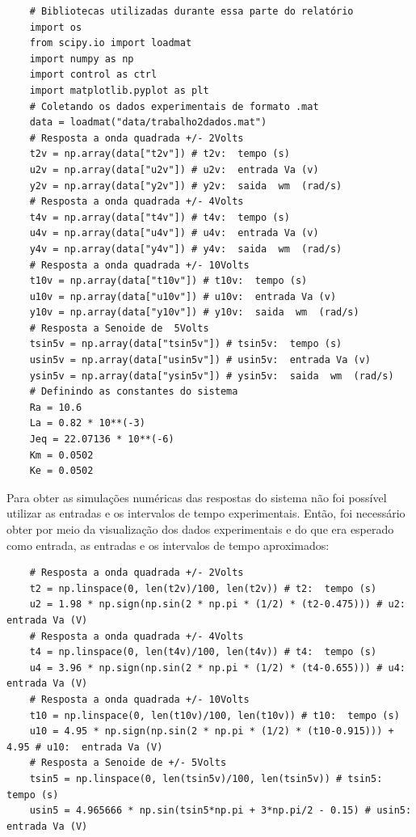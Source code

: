 \documentclass[10pt]{article}
\begin{document}
\begin{verbatim}
    # Bibliotecas utilizadas durante essa parte do relatório
    import os
    from scipy.io import loadmat
    import numpy as np
    import control as ctrl
    import matplotlib.pyplot as plt
    # Coletando os dados experimentais de formato .mat
    data = loadmat("data/trabalho2dados.mat")
    # Resposta a onda quadrada +/- 2Volts
    t2v = np.array(data["t2v"]) # t2v:  tempo (s)
    u2v = np.array(data["u2v"]) # u2v:  entrada Va (v)
    y2v = np.array(data["y2v"]) # y2v:  saida  wm  (rad/s)
    # Resposta a onda quadrada +/- 4Volts
    t4v = np.array(data["t4v"]) # t4v:  tempo (s)
    u4v = np.array(data["u4v"]) # u4v:  entrada Va (v)
    y4v = np.array(data["y4v"]) # y4v:  saida  wm  (rad/s)
    # Resposta a onda quadrada +/- 10Volts
    t10v = np.array(data["t10v"]) # t10v:  tempo (s)
    u10v = np.array(data["u10v"]) # u10v:  entrada Va (v)
    y10v = np.array(data["y10v"]) # y10v:  saida  wm  (rad/s)
    # Resposta a Senoide de  5Volts 
    tsin5v = np.array(data["tsin5v"]) # tsin5v:  tempo (s)
    usin5v = np.array(data["usin5v"]) # usin5v:  entrada Va (v)
    ysin5v = np.array(data["ysin5v"]) # ysin5v:  saida  wm  (rad/s)
    # Definindo as constantes do sistema
    Ra = 10.6
    La = 0.82 * 10**(-3)
    Jeq = 22.07136 * 10**(-6)
    Km = 0.0502
    Ke = 0.0502
\end{verbatim}

\quad Para obter as simulações numéricas das respostas do sistema não foi possível utilizar as entradas
e os intervalos de tempo experimentais. Então, foi necessário obter por meio da visualização dos dados experimentais e
do que era esperado como entrada, as entradas e os intervalos de tempo aproximados:

\begin{verbatim}
    # Resposta a onda quadrada +/- 2Volts
    t2 = np.linspace(0, len(t2v)/100, len(t2v)) # t2:  tempo (s)
    u2 = 1.98 * np.sign(np.sin(2 * np.pi * (1/2) * (t2-0.475))) # u2:  entrada Va (V)
    # Resposta a onda quadrada +/- 4Volts
    t4 = np.linspace(0, len(t4v)/100, len(t4v)) # t4:  tempo (s)
    u4 = 3.96 * np.sign(np.sin(2 * np.pi * (1/2) * (t4-0.655))) # u4:  entrada Va (V)
    # Resposta a onda quadrada +/- 10Volts
    t10 = np.linspace(0, len(t10v)/100, len(t10v)) # t10:  tempo (s)
    u10 = 4.95 * np.sign(np.sin(2 * np.pi * (1/2) * (t10-0.915))) + 4.95 # u10:  entrada Va (V)
    # Resposta a Senoide de +/- 5Volts 
    tsin5 = np.linspace(0, len(tsin5v)/100, len(tsin5v)) # tsin5:  tempo (s)
    usin5 = 4.965666 * np.sin(tsin5*np.pi + 3*np.pi/2 - 0.15) # usin5:  entrada Va (V)
\end{verbatim}
\end{document}
